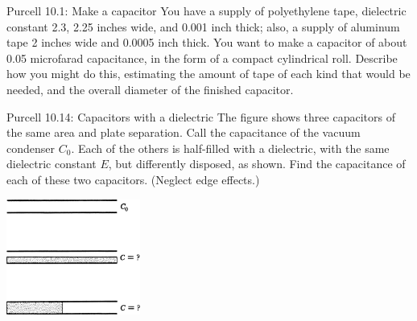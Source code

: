 \documentclass{esg8022pset}
\begin{document}
\begin{problem}{Purcell 10.1: Make a capacitor}
  You have a supply of polyethylene tape, dielectric constant 
  2.3, 2.25 inches wide, and 0.001 inch thick; also, a supply of aluminum 
  tape 2 inches wide and 0.0005 inch thick. You want to make a capacitor
  of about 0.05 microfarad capacitance, in the form of a compact 
  cylindrical roll. Describe how you might do this, estimating the 
  amount of tape of each kind that would be needed, and the overall 
  diameter of the finished capacitor. 
\end{problem}
\begin{solution}

\end{solution}






\begin{problem}{Purcell 10.14: Capacitors with a dielectric}
  The figure shows three capacitors of the same area and plate 
  separation. Call the capacitance of the vacuum condenser $C_0$. Each of 
  the others is half-filled with a dielectric, with the same dielectric constant
  $E$, but differently disposed, as shown. Find the capacitance of 
  each of these two capacitors. (Neglect edge effects.)
  \begin{center}\includegraphics[width=0.33\textwidth]{ps04_08}\end{center}
\end{problem}
\begin{solution}

\end{solution}
\end{document}
